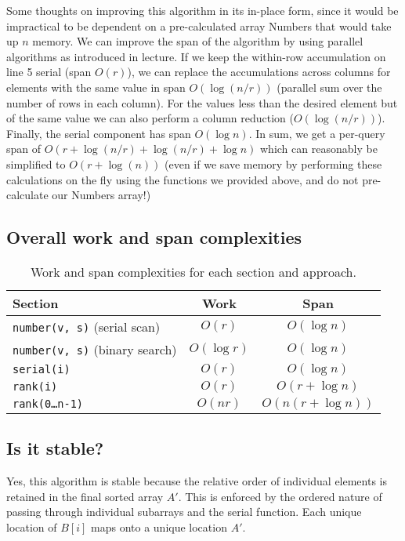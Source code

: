 \documentclass[11pt]{article}
\theoremstyle{definition}
\begin{document}
Some thoughts on improving this algorithm in its in-place form, since it would be impractical to be dependent on a pre-calculated array Numbers that would take up $n$ memory. We can improve the span of the algorithm by using parallel algorithms as introduced in lecture. If we keep the within-row accumulation on line 5 serial (span $O(r)$), we can replace the accumulations across columns for elements with the same value in span $O(\log(n/r))$ (parallel sum over the number of rows in each column). For the values less than the desired element but of the same value we can also perform a column reduction ($O(\log(n/r))$). Finally, the serial component has span $O(\log n)$. In sum, we get a per-query span of $O(r+\log (n/r)+\log (n/r)+\log n)$ which can reasonably be simplified to $O(r + \log(n))$ (even if we save memory by performing these calculations on the fly using the functions we provided above, and do not pre-calculate our Numbers array!)

\subsection{Overall work and span complexities}

\begin{table}[H]
\centering
\begin{tabular}{|l|c|c|}
\hline
\textbf{Section} & \textbf{Work} & \textbf{Span} \\
\hline
\texttt{number(v, s)} (serial scan) & $O(r)$ & $O(\log n)$ \\
\texttt{number(v, s)} (binary search) & $O(\log r)$ & $O(\log n)$ \\
\texttt{serial(i)} & $O(r)$ & $O(\log n)$ \\
\texttt{rank(i)} & $O(r)$ & $O(r + \log n)$ \\
\hline
\texttt{rank(0\ldots n-1)} & $O(nr)$ & $O(n(r + \log n))$ \\
\hline
\end{tabular}
\caption{Work and span complexities for each section and approach.}
\label{tab:complexity}
\end{table}

\subsection{Is it stable?}

Yes, this algorithm is stable because the relative order of individual elements is retained in the final sorted array $A'$. This is enforced by the ordered nature of passing through individual subarrays and the serial function. Each unique location of $B[i]$ maps onto a unique location $A'$.
\end{document}
